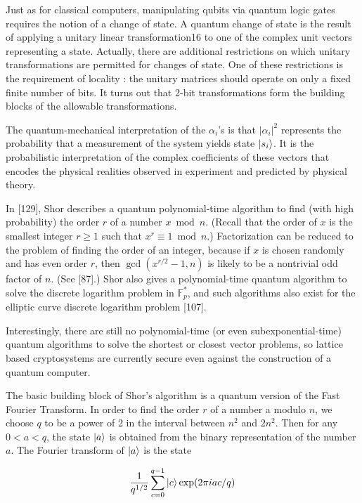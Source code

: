 \documentclass{article}
\begin{document}
Just as for classical computers, manipulating qubits via quantum logic gates requires the notion of a change of state. A quantum change of state is the result of applying a unitary linear transformation16 to one of the complex unit vectors representing a state. Actually, there are additional restrictions on which unitary transformations are permitted for changes of state. One of these restrictions is the requirement of locality : the unitary matrices should operate on only a fixed finite number of bits. It turns out that 2-bit transformations form the building blocks of the allowable transformations.

The quantum-mechanical interpretation of the \(\alpha_i\)'s is that \(|\alpha_i|^2\) represents the probability that a measurement of the system yields state \(\ket{s_i}\). It is the probabilistic interpretation of the complex coefficients of these vectors that encodes the physical realities observed in experiment and predicted by physical theory.

In [129], Shor describes a quantum polynomial-time algorithm to find (with high probability) the order \(r\) of a number \(x \bmod n\). (Recall that the order of \(x\) is the smallest integer \(r \geq 1\) such that \(x^r \equiv 1 \bmod n\).) Factorization can be reduced to the problem of finding the order of an integer, because if \(x\) is chosen randomly and has even order \(r\), then \(\gcd(x^{r/2} - 1, n)\) is likely to be a nontrivial odd factor of \(n\). (See [87].) Shor also gives a polynomial-time quantum algorithm to solve the discrete logarithm problem in \(\mathbb{F}_p^*\), and such algorithms also exist for the elliptic curve discrete logarithm problem [107]. 

Interestingly, there are still no polynomial-time (or even subexponential-time) quantum algorithms to solve the shortest or closest vector problems, so lattice based cryptosystems are currently secure even against the construction of a quantum computer.
 
The basic building block of Shor's algorithm is a quantum version of the Fast Fourier Transform. In order to find the order \(r\) of a number a modulo \(n\), we choose \(q\) to be a power of 2 in the interval between \(n^{2}\) and \(2n^{2}\). Then for any \(0 < a < q\), the state \(\ket{a}\) is obtained from the binary representation of the number \(a\). The Fourier transform of \(\ket{a}\) is the state

\[
	\frac{1}{q^{1/2}} \sum_{c = 0}^{q - 1} \ket{c} \exp(2\pi i a c /q)
\]
\end{document}
